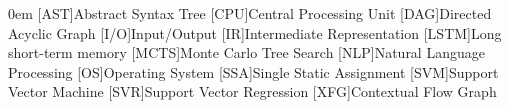 \begin{acronym}[LSTM]\itemsep0em
    [AST]{Abstract Syntax Tree}
    [CPU]{Central Processing Unit}
    [DAG]{Directed Acyclic Graph}
    [I/O]{Input/Output}
    [IR]{Intermediate Representation}
    [LSTM]{Long short-term memory}
    [MCTS]{Monte Carlo Tree Search}
    [NLP]{Natural Language Processing}
    [OS]{Operating System}
    [SSA]{Single Static Assignment}
    [SVM]{Support Vector Machine}
    [SVR]{Support Vector Regression}
    [XFG]{Contextual Flow Graph}
\end{acronym}
